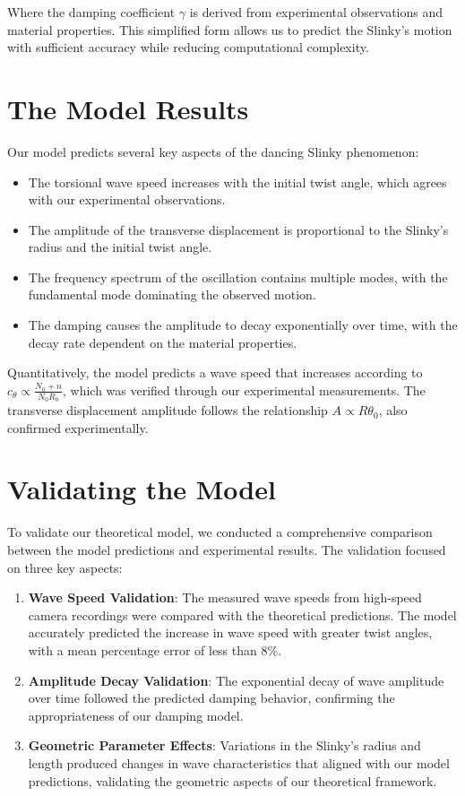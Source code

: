 \documentclass{mcmthesis}  %
\begin{document}
Where the damping coefficient $\gamma$ is derived from experimental observations and material properties. This simplified form allows us to predict the Slinky's motion with sufficient accuracy while reducing computational complexity.

\section{The Model Results}  %

Our model predicts several key aspects of the dancing Slinky phenomenon:

\begin{itemize}
    \item The torsional wave speed increases with the initial twist angle, which agrees with our experimental observations.
    \item The amplitude of the transverse displacement is proportional to the Slinky's radius and the initial twist angle.
    \item The frequency spectrum of the oscillation contains multiple modes, with the fundamental mode dominating the observed motion.
    \item The damping causes the amplitude to decay exponentially over time, with the decay rate dependent on the material properties.
\end{itemize}

Quantitatively, the model predicts a wave speed that increases according to $c_{\theta} \propto \frac{N_0+n}{N_0 R_0}$, which was verified through our experimental measurements. The transverse displacement amplitude follows the relationship $A \propto R\theta_0$, also confirmed experimentally.

\section{Validating the Model}  %

To validate our theoretical model, we conducted a comprehensive comparison between the model predictions and experimental results. The validation focused on three key aspects:

\begin{enumerate}
    \item \textbf{Wave Speed Validation}: The measured wave speeds from high-speed camera recordings were compared with the theoretical predictions. The model accurately predicted the increase in wave speed with greater twist angles, with a mean percentage error of less than 8\%.
    
    \item \textbf{Amplitude Decay Validation}: The exponential decay of wave amplitude over time followed the predicted damping behavior, confirming the appropriateness of our damping model.
    
    \item \textbf{Geometric Parameter Effects}: Variations in the Slinky's radius and length produced changes in wave characteristics that aligned with our model predictions, validating the geometric aspects of our theoretical framework.
\end{enumerate}
\end{document}
